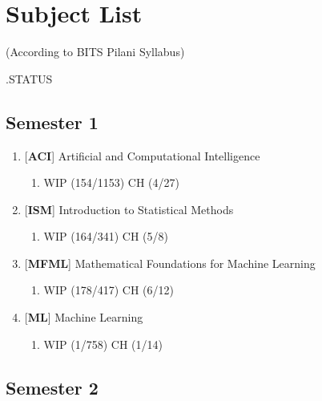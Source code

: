 \chapter*{Subject List}

\begin{center}
(According to BITS Pilani Syllabus)
\end{center}

.\hfill STATUS

\section*{Semester 1}
\begin{enumerate}[series=sublist]
    \item {[\textbf{ACI}]} Artificial and Computational Intelligence
        \begin{enumerate}
            \item {}
            \hfill WIP (154/1153) CH (4/27)
        \end{enumerate}

    \item {[\textbf{ISM}]} Introduction to Statistical Methods
        \begin{enumerate}
            \item {}
            \hfill WIP (164/341) CH (5/8)
        \end{enumerate}

    \item {[\textbf{MFML}]} Mathematical Foundations for Machine Learning
        \begin{enumerate}
            \item {}
            \hfill WIP (178/417) CH (6/12)
        \end{enumerate}

    \item {[\textbf{ML}]} Machine Learning
        \begin{enumerate}
            \item {}
            \hfill WIP (1/758) CH (1/14)
        \end{enumerate}
\end{enumerate}


\section*{Semester 2}


